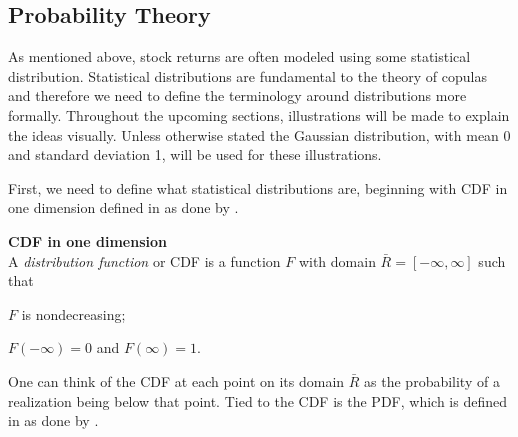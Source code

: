 





\subsection{Probability Theory}\label{sec:ProbabilityTheory}
As mentioned above, stock returns are often modeled using some statistical distribution. Statistical distributions are fundamental to the theory of copulas and therefore we need to define the terminology around distributions more formally. Throughout the upcoming sections, illustrations will be made to explain the ideas visually. Unless otherwise stated the Gaussian distribution, with mean 0 and standard deviation 1, will be used for these illustrations.

First, we need to define what statistical distributions are, beginning with \gls{CDF} in one dimension defined in  as done by .
\begin{definition}\label{def:CDF1d} \textbf{CDF in one dimension }\\
    A \emph{distribution function} or \gls{CDF} is a function $F$ with domain $\bar{R} = [-\infty, \infty]$ such that 
    \begin{compactenum}
        \item $F$ is nondecreasing; 
        \item $F(-\infty)=0$ and $F(\infty)=1$.
    \end{compactenum}
\end{definition}

One can think of the \gls{CDF} at each point on its domain $\bar{R}$ as the probability of a realization being below that point. Tied to the \gls{CDF} is the \gls{PDF}, which is defined in  as done by .

